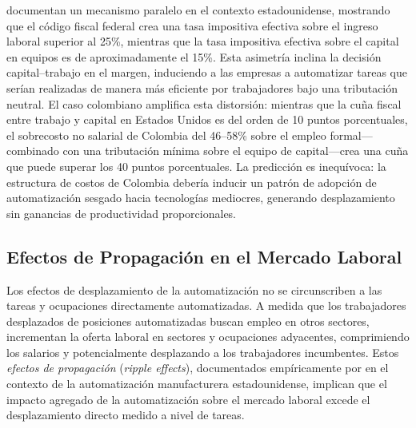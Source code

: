 \documentclass{article}
\begin{document}
\cite{acemoglu2020taxes} documentan un mecanismo paralelo en el contexto estadounidense, mostrando que el c\'odigo fiscal federal crea una tasa impositiva efectiva sobre el ingreso laboral superior al 25\%, mientras que la tasa impositiva efectiva sobre el capital en equipos es de aproximadamente el 15\%. Esta asimetr\'ia inclina la decisi\'on capital--trabajo en el margen, induciendo a las empresas a automatizar tareas que ser\'ian realizadas de manera m\'as eficiente por trabajadores bajo una tributaci\'on neutral. El caso colombiano amplifica esta distorsi\'on: mientras que la cu\~na fiscal entre trabajo y capital en Estados Unidos es del orden de 10 puntos porcentuales, el sobrecosto no salarial de Colombia del 46--58\% sobre el empleo formal---combinado con una tributaci\'on m\'inima sobre el equipo de capital---crea una cu\~na que puede superar los 40 puntos porcentuales. La predicci\'on es inequ\'ivoca: la estructura de costos de Colombia deber\'ia inducir un patr\'on de adopci\'on de automatizaci\'on sesgado hacia tecnolog\'ias mediocres, generando desplazamiento sin ganancias de productividad proporcionales.


\subsection{Efectos de Propagaci\'on en el Mercado Laboral}
\label{subsec:ripples}

Los efectos de desplazamiento de la automatizaci\'on no se circunscriben a las tareas y ocupaciones directamente automatizadas. A medida que los trabajadores desplazados de posiciones automatizadas buscan empleo en otros sectores, incrementan la oferta laboral en sectores y ocupaciones adyacentes, comprimiendo los salarios y potencialmente desplazando a los trabajadores incumbentes. Estos \textit{efectos de propagaci\'on} (\textit{ripple effects}), documentados emp\'iricamente por \cite{acemoglu2020robots} en el contexto de la automatizaci\'on manufacturera estadounidense, implican que el impacto agregado de la automatizaci\'on sobre el mercado laboral excede el desplazamiento directo medido a nivel de tareas.
\end{document}
